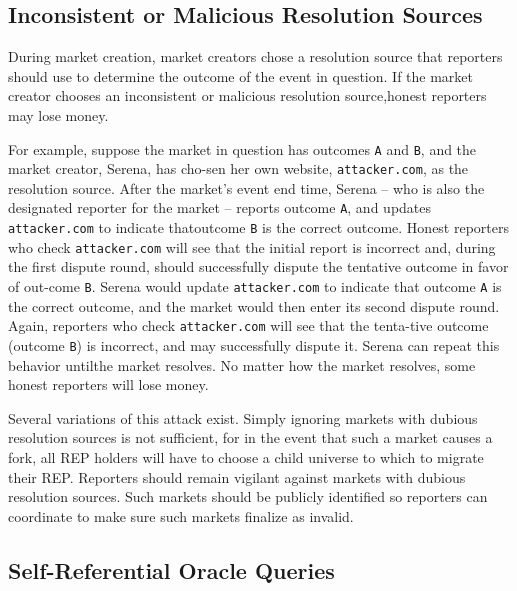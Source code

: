 \documentclass[12pt,floatfix,reprint,nofootinbib,amsmath,amssymb,epsfig,pre,floats,letterpaper,groupedaffiliation]{revtex4-1}
\theoremstyle{definition}
\theoremstyle{definition}
\begin{document}
\subsection{Inconsistent or Malicious Resolution Sources}

During market creation, market creators chose a resolution source that reporters should use to determine the outcome of the event in question. If the market creator chooses an inconsistent or malicious resolution source,\linebreak honest reporters may lose money.

For example, suppose the market in question has outcomes \texttt{A} and \texttt{B}, and the market creator, Serena, has cho-\linebreak sen her own website, \texttt{attacker.com}, as the resolution source. After the market's event end time, Serena -- who is also the designated reporter for the market -- reports outcome \texttt{A}, and updates \texttt{attacker.com} to indicate that\linebreak outcome \texttt{B} is the correct outcome. Honest reporters who check \texttt{attacker.com} will see that the initial report is in\-correct and, during the first dispute round, should suc\-cessfully dispute the tentative outcome in favor of out-\linebreak come \texttt{B}. Serena would update \texttt{attacker.com} to indicate that outcome \texttt{A} is the correct outcome, and the market would then enter its second dispute round. Again, reporters who check \texttt{attacker.com} will see that the tenta-\linebreak tive outcome (outcome \texttt{B}) is incorrect, and may successfully dispute it. Serena can repeat this behavior until\linebreak the market resolves. No matter how the market resolves, some honest reporters will lose money.

Several variations of this attack exist. Simply ignoring markets with dubious resolution sources is not sufficient, for in the event that such a market causes a fork, all REP holders will have to choose a child universe to which to migrate their REP. Reporters should remain vigilant against markets with dubious resolution sources. Such markets should be publicly identified so reporters can coordinate to make sure such markets finalize as invalid.

\subsection{Self-Referential Oracle Queries}
\end{document}
